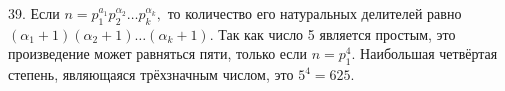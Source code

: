 39. Если $n=p_1^{a_1}p_2^{\alpha_2}\ldots p_k^{\alpha_k},$ то количество его натуральных делителей равно $(\alpha_1+1)(\alpha_2+1)\ldots (\alpha_k+1).$ Так как число 5 является простым, это произведение может равняться пяти, только если $n=p_1^4.$ Наибольшая четвёртая степень, являющаяся трёхзначным числом, это $5^4=625.$\\
